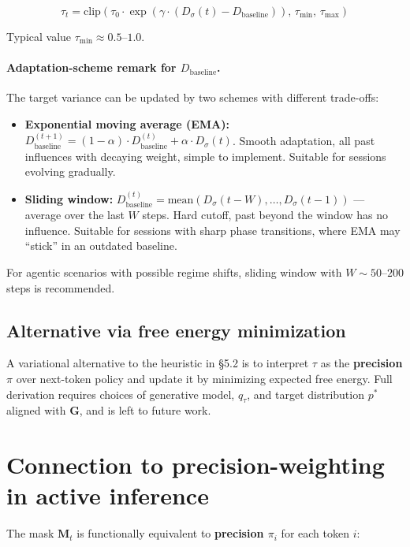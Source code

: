 \documentclass[12pt,a4paper]{article}
\begin{document}
\begin{equation}
\tau_t = \mathrm{clip}\!\left(\tau_0 \cdot \exp(\gamma \cdot (D_\sigma(t) - D_{\text{baseline}})), \, \tau_{\min}, \, \tau_{\max}\right)
\end{equation}

Typical value $\tau_{\min} \approx 0.5$--$1.0$.

\paragraph{Adaptation-scheme remark for $D_{\text{baseline}}$.} The target variance can be updated by two schemes with different trade-offs:

\begin{itemize}
    \item \textbf{Exponential moving average (EMA):} $D_{\text{baseline}}^{(t+1)} = (1-\alpha) \cdot D_{\text{baseline}}^{(t)} + \alpha \cdot D_\sigma(t)$. Smooth adaptation, all past influences with decaying weight, simple to implement. Suitable for sessions evolving gradually.
    \item \textbf{Sliding window:} $D_{\text{baseline}}^{(t)} = \mathrm{mean}(D_\sigma(t-W), \ldots, D_\sigma(t-1))$ --- average over the last $W$ steps. Hard cutoff, past beyond the window has no influence. Suitable for sessions with sharp phase transitions, where EMA may ``stick'' in an outdated baseline.
\end{itemize}

For agentic scenarios with possible regime shifts, sliding window with $W \sim 50$--$200$ steps is recommended.

\subsection{Alternative via free energy minimization}

A variational alternative to the heuristic in \S5.2 is to interpret $\tau$ as the \textbf{precision $\pi$} over next-token policy and update it by minimizing expected free energy. Full derivation requires choices of generative model, $q_\tau$, and target distribution $p^*$ aligned with $\mathbf{G}$, and is left to future work.

\section{Connection to precision-weighting in active inference}

The mask $\mathbf{M}_t$ is functionally equivalent to \textbf{precision $\pi_i$} for each token $i$:
\end{document}
